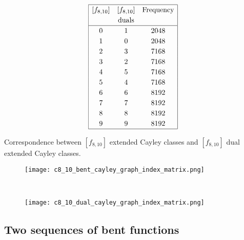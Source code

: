 \begin{table}
\small{}
\begin{align*}
\def\arraystretch{1.2}
\begin{array}{|ccc|}
\hline
[f_{8,10}] &
[f_{8,10}] &
\text{Frequency}
\\
&
\text{duals} &
\\
\hline
  0 &    1 & 2048
\\
  1 &    0 & 2048
\\
  2 &    3 & 7168
\\
  3 &    2 & 7168
\\
  4 &    5 & 7168
\\
  5 &    4 & 7168
\\
  6 &    6 & 8192
\\
  7 &    7 & 8192
\\
  8 &    8 & 8192
\\
  9 &    9 & 8192
\\
\hline
\end{array}
\end{align*}
\caption{Correspondence between $[f_{8,10}]$ extended Cayley classes and $[f_{8,10}]$ dual extended Cayley classes.}
\label{tab-c8_10-dual-EC_classes}
\end{table}

\begin{figure}[!bhpt] %
\centering
\begin{minipage}{.48\textwidth}
  \centering
  \texttt{[image: c8\_10\_bent\_cayley\_graph\_index\_matrix.png]}
  \label{fig:c8_10_bent_cayley_graph_index_matrix}
\end{minipage}
~~
\begin{minipage}{.48\textwidth}
  \centering
  \texttt{[image: c8\_10\_dual\_cayley\_graph\_index\_matrix.png]}
  \label{fig:c8_10_dual_cayley_graph_index_matrix}
\end{minipage}%
\end{figure}
\newpage

\subsection{Two sequences of bent functions}

